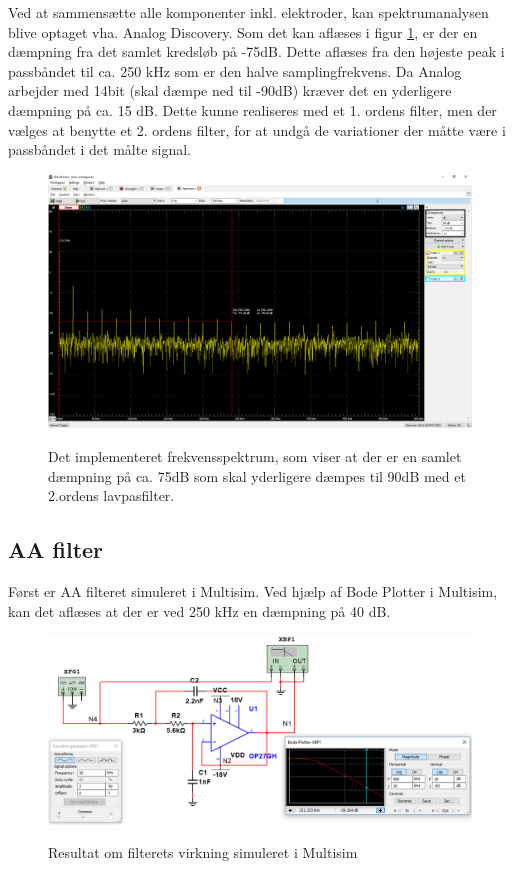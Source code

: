 Ved at sammensætte alle komponenter inkl. elektroder, kan spektrumanalysen blive optaget vha. Analog Discovery. Som det kan aflæses i figur \ref{fig:aaspectrum1}, er der en dæmpning fra det samlet kredsløb på -75dB. Dette aflæses fra den højeste peak i passbåndet til ca. 250 kHz som er den halve samplingfrekvens. Da Analog arbejder med 14bit (skal dæmpe ned til -90dB) kræver det en yderligere dæmpning på ca. 15 dB. Dette kunne realiseres med et 1. ordens filter, men der vælges at benytte et 2. ordens filter, for at undgå de variationer der måtte være i passbåndet i det målte signal.


\begin{figure}[H] 
\centering
{\includegraphics[width=\linewidth]
{Figure/aaspectrum1}}
\caption{Det implementeret frekvensspektrum, som viser at der er en samlet dæmpning på ca. 75dB som skal yderligere dæmpes til 90dB med et 2.ordens lavpasfilter.}
\label{fig:aaspectrum1}
\end{figure}


\subsection{AA filter}

Først er AA filteret simuleret i Multisim. Ved hjælp af Bode Plotter i Multisim, kan det aflæses at der er ved 250 kHz en dæmpning på 40 dB.


\begin{figure}[H] 
\centering
{\includegraphics[width=\linewidth]
{Figure/aafilterbodemultisim}}
\caption{Resultat om filterets virkning simuleret i Multisim}
\label{fig:aafilterbodemultisim}
\end{figure}

